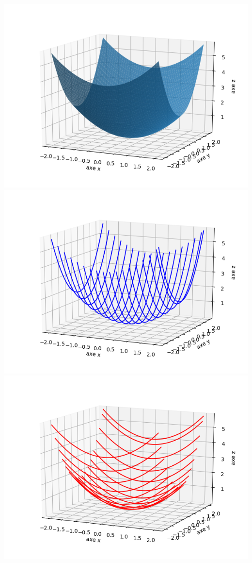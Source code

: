 \begin{exemple}{}{}
	\begin{center}
		\includegraphics[scale=\myscale,scale=0.5]{figures/fonctions-quadra-1a}
		\includegraphics[scale=\myscale,scale=0.5]{figures/fonctions-quadra-1b}
		\includegraphics[scale=\myscale,scale=0.5]{figures/fonctions-quadra-1c}

\end{center}
\end{exemple}
